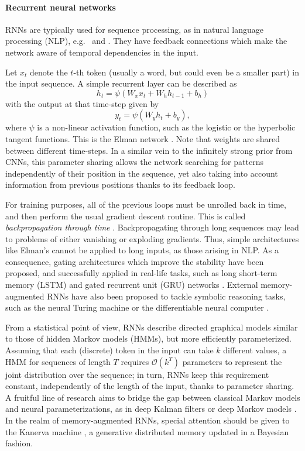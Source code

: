 \paragraph{Recurrent neural networks} RNNs are typically used for sequence processing, as in natural language processing (NLP), e.g.\ \parencite{hochreiter1997long} and \parencite{chung2014empirical}. They have feedback connections which make the network aware of temporal dependencies in the input.

Let $x_t$ denote the $t$-th token (usually a word, but could even be 
a smaller part) in the input sequence. A simple recurrent layer can be described as
$$
h_t = \psi(W_x x_t + W_h h_{t-1} + b_h)
$$
with the output at that time-step given by
$$
y_t = \psi(W_y h_t + b_y),
$$
where $\psi$ is a non-linear activation function, such as the logistic or the hyperbolic tangent functions. This is the Elman network \parencite{cruse2006neural}. Note that weights are shared between different time-steps. In a similar vein to the infinitely strong prior from CNNs, this parameter sharing allows the network searching for patterns independently of their position in the sequence, yet also taking into account information from previous positions thanks to its feedback loop.

For training purposes, all of the previous loops must be unrolled back in time, and then perform the usual gradient descent routine.
This is called \emph{backpropagation through time} \parencite{58337}.
Backpropagating through long sequences may lead to problems
of either vanishing or exploding gradients. Thus, 
simple architectures like Elman's cannot be applied to long inputs, as those arising in NLP. 
As a consequence, gating architectures which improve the stability have been proposed, and successfully applied in real-life tasks,
such as long 
short-term memory (LSTM) \parencite{hochreiter1997long} and gated recurrent unit (GRU) networks \parencite{cho2014learning}. 
External memory-augmented RNNs have also been proposed to tackle symbolic reasoning tasks, such as the neural Turing machine \parencite{graves2014neural} or the differentiable neural computer \parencite{graves2016hybrid}.

From a statistical point of view, RNNs describe directed graphical models similar to those of hidden Markov models (HMMs), but more efficiently parameterized. Assuming that each (discrete) token in the input can take $k$ different values, a HMM for sequences of length $T$ requires $\mathcal{O}(k^T)$ parameters to represent
the joint distribution over the sequence; in turn, RNNs keep this requirement constant, independently of the length of the input, thanks to parameter sharing. A fruitful line of research aims to bridge the gap between classical Markov models and neural parameterizations, as in deep Kalman filters \parencite{krishnan2015deep} or deep Markov models \parencite{krishnan2016structured}. In the realm of memory-augmented RNNs, special attention should be given to the Kanerva machine \parencite{wu2018kanerva}, a generative distributed memory updated in a Bayesian fashion.




